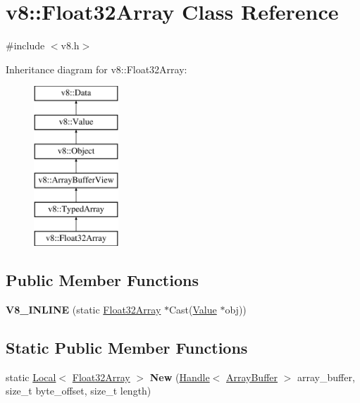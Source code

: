 \hypertarget{classv8_1_1_float32_array}{}\section{v8\+:\+:Float32\+Array Class Reference}
\label{classv8_1_1_float32_array}


{\ttfamily \#include $<$v8.\+h$>$}

Inheritance diagram for v8\+:\+:Float32\+Array\+:\begin{figure}[H]
\begin{center}
\leavevmode
\includegraphics[height=6.000000cm]{classv8_1_1_float32_array}
\end{center}
\end{figure}
\subsection*{Public Member Functions}
\begin{DoxyCompactItemize}
\item 
\hypertarget{classv8_1_1_float32_array_a954944ab47d5da9b67025ac40902a6f7}{}{\bfseries V8\+\_\+\+I\+N\+L\+I\+N\+E} (static \hyperlink{classv8_1_1_float32_array}{Float32\+Array} $\ast$Cast(\hyperlink{classv8_1_1_value}{Value} $\ast$obj))\label{classv8_1_1_float32_array_a954944ab47d5da9b67025ac40902a6f7}

\end{DoxyCompactItemize}
\subsection*{Static Public Member Functions}
\begin{DoxyCompactItemize}
\item 
\hypertarget{classv8_1_1_float32_array_a6fea1d1987ec9abce97060900d5fc4af}{}static \hyperlink{classv8_1_1_local}{Local}$<$ \hyperlink{classv8_1_1_float32_array}{Float32\+Array} $>$ {\bfseries New} (\hyperlink{classv8_1_1_handle}{Handle}$<$ \hyperlink{classv8_1_1_array_buffer}{Array\+Buffer} $>$ array\+\_\+buffer, size\+\_\+t byte\+\_\+offset, size\+\_\+t length)\label{classv8_1_1_float32_array_a6fea1d1987ec9abce97060900d5fc4af}

\end{DoxyCompactItemize}
